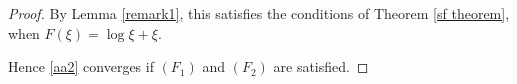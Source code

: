 \documentclass[10pt,a4paper]{amsart}
\begin{document}
\begin{proof}
By Lemma \ref{remark1}, this satisfies the conditions of Theorem \ref{sf theorem}, when $F(\xi) = \log \xi+\xi$.


Hence \eqref{aa2} converges if $(F_1)$ and $(F_2)$ are satisfied.
\end{proof}
\end{document}
